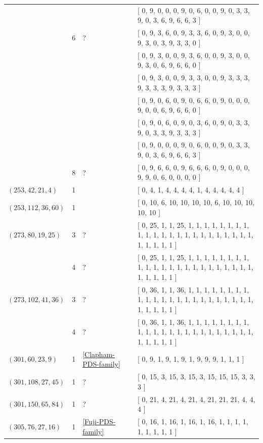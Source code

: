 \documentclass[12pt]{amsproc} %
\theoremstyle{definition}\newtheorem{defn}[thm]{Definition}
\theoremstyle{definition}\newtheorem{rem}[thm]{Remark}
\theoremstyle{definition}\newtheorem{ex}[thm]{Example}
\begin{document}
\begin{center}
\begin{longtable}{p{3.66cm}|P{0.8cm}|P{0.69cm}|p{10cm}}
		   &  &  & [ 0, 9, 0, 0, 0, 9, 0, 6, 0, 0, 9, 0, 3, 3, 9, 0, 3, 6, 9, 6, 6, 3 ] \\
		   & 6 & ? & [ 0, 9, 3, 6, 0, 9, 3, 3, 6, 0, 9, 3, 0, 0, 9, 3, 0, 3, 9, 3, 3, 0 ] \\
		   &  &  & [ 0, 9, 3, 0, 0, 9, 3, 6, 0, 0, 9, 3, 0, 0, 9, 3, 0, 6, 9, 6, 6, 0 ] \\
		   &  &  & [ 0, 9, 3, 0, 0, 9, 3, 3, 0, 0, 9, 3, 3, 3, 9, 3, 3, 3, 9, 3, 3, 3 ] \\
		   &  &  & [ 0, 9, 0, 6, 0, 9, 0, 6, 6, 0, 9, 0, 0, 0, 9, 0, 0, 6, 9, 6, 6, 0 ] \\
		   &  &  & [ 0, 9, 0, 6, 0, 9, 0, 3, 6, 0, 9, 0, 3, 3, 9, 0, 3, 3, 9, 3, 3, 3 ] \\
		   &  &  & [ 0, 9, 0, 0, 0, 9, 0, 6, 0, 0, 9, 0, 3, 3, 9, 0, 3, 6, 9, 6, 6, 3 ] \\
		   & 8 & ? & [ 0, 9, 6, 6, 0, 9, 6, 6, 6, 0, 9, 0, 0, 0, 9, 9, 0, 6, 0, 0, 0, 0 ] \\
		\hline
		 $(253, 42, 21, 4)$  & 1 & \cite{pol-dav-smi-swa} & [ 0, 4, 1, 4, 4, 4, 4, 1, 4, 4, 4, 4, 4 ] \\
		\hline
		 $(253, 112, 36, 60)$  & 1 & \cite{brouwer-maldeghem} & [ 0, 10, 6, 10, 10, 10, 10, 6, 10, 10, 10, 10, 10 ] \\
		\hline
		 $(273, 80, 19, 25)$  & 3 & ? & [ 0, 25, 1, 1, 25, 1, 1, 1, 1, 1, 1, 1, 1, 1, 1, 1, 1, 1, 1, 1, 1, 1, 1, 1, 1, 1, 1, 1, 1, 1, 1, 1, 1 ] \\
		   & 4 & ? & [ 0, 25, 1, 1, 25, 1, 1, 1, 1, 1, 1, 1, 1, 1, 1, 1, 1, 1, 1, 1, 1, 1, 1, 1, 1, 1, 1, 1, 1, 1, 1, 1, 1 ] \\
		\hline
		 $(273, 102, 41, 36)$  & 3 & ? & [ 0, 36, 1, 1, 36, 1, 1, 1, 1, 1, 1, 1, 1, 1, 1, 1, 1, 1, 1, 1, 1, 1, 1, 1, 1, 1, 1, 1, 1, 1, 1, 1, 1 ] \\
		   & 4 & ? & [ 0, 36, 1, 1, 36, 1, 1, 1, 1, 1, 1, 1, 1, 1, 1, 1, 1, 1, 1, 1, 1, 1, 1, 1, 1, 1, 1, 1, 1, 1, 1, 1, 1 ] \\
		\hline
		 $(301, 60, 23, 9)$  & 1 & \ref{Clapham-PDS-family} & [ 0, 9, 1, 9, 1, 9, 1, 9, 9, 9, 1, 1, 1 ] \\
		\hline
		 $(301, 108, 27, 45)$  & 1 & ? & [ 0, 15, 3, 15, 3, 15, 3, 15, 15, 15, 3, 3, 3 ] \\
		\hline
		 $(301, 150, 65, 84)$  & 1 & ? & [ 0, 21, 4, 21, 4, 21, 4, 21, 21, 21, 4, 4, 4 ] \\
		\hline
		 $(305, 76, 27, 16)$  & 1 & \ref{Fuji-PDS-family} & [ 0, 16, 1, 16, 1, 16, 1, 16, 1, 1, 1, 1, 1, 1, 1, 1, 1 ] \\

\end{longtable}
\end{center}
\end{document}
